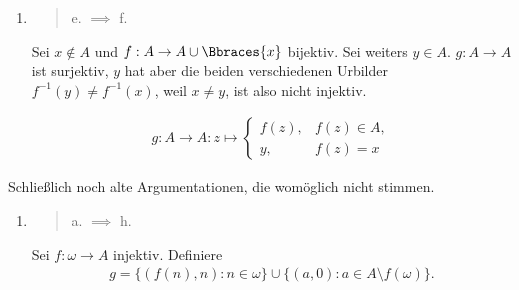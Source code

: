 \begin{solution}
\begin{enumerate}[label = \texttt{ad}]

  \item \blockquote{e. $\implies$ f.}:

  Sei $x \not \in A$ und $f: A \to A \cup \Bbraces{x}$ bijektiv.
  Sei weiters $y \in A$.
  $g: A \to A$ ist surjektiv, $y$ hat aber die beiden verschiedenen Urbilder $f^{-1}(y) \neq f^{-1}(x)$, weil $x \neq y$, ist also nicht injektiv.

  \begin{align*}
    g:
    A \to A:
    z
    \mapsto
    \begin{cases}
      f(z), & f(z) \in A, \\
      y,    & f(z) = x
    \end{cases}
  \end{align*}
\end{enumerate}



Schließlich noch alte Argumentationen, die womöglich nicht stimmen.

\begin{enumerate}[label = \texttt{ad}]
	\item \blockquote{a. $\implies$ h.}: Sei $f: \omega \to A$ injektiv. Definiere
	\begin{align*}
	g = \{(f(n), n): n \in \omega\} \cup \{(a,0): a \in A \setminus f(\omega)\}.
	\end{align*}
\end{enumerate}

\end{solution}

